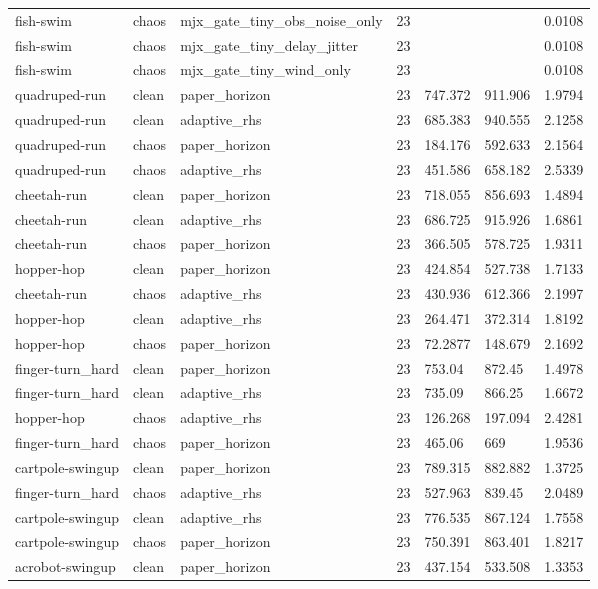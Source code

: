 \begin{tabular}{lllllll}
fish-swim & chaos & mjx\_gate\_tiny\_obs\_noise\_only & 23 &  &  & 0.0108 \\
fish-swim & chaos & mjx\_gate\_tiny\_delay\_jitter & 23 &  &  & 0.0108 \\
fish-swim & chaos & mjx\_gate\_tiny\_wind\_only & 23 &  &  & 0.0108 \\
quadruped-run & clean & paper\_horizon & 23 & 747.372 & 911.906 & 1.9794 \\
quadruped-run & clean & adaptive\_rhs & 23 & 685.383 & 940.555 & 2.1258 \\
quadruped-run & chaos & paper\_horizon & 23 & 184.176 & 592.633 & 2.1564 \\
quadruped-run & chaos & adaptive\_rhs & 23 & 451.586 & 658.182 & 2.5339 \\
cheetah-run & clean & paper\_horizon & 23 & 718.055 & 856.693 & 1.4894 \\
cheetah-run & clean & adaptive\_rhs & 23 & 686.725 & 915.926 & 1.6861 \\
cheetah-run & chaos & paper\_horizon & 23 & 366.505 & 578.725 & 1.9311 \\
hopper-hop & clean & paper\_horizon & 23 & 424.854 & 527.738 & 1.7133 \\
cheetah-run & chaos & adaptive\_rhs & 23 & 430.936 & 612.366 & 2.1997 \\
hopper-hop & clean & adaptive\_rhs & 23 & 264.471 & 372.314 & 1.8192 \\
hopper-hop & chaos & paper\_horizon & 23 & 72.2877 & 148.679 & 2.1692 \\
finger-turn\_hard & clean & paper\_horizon & 23 & 753.04 & 872.45 & 1.4978 \\
finger-turn\_hard & clean & adaptive\_rhs & 23 & 735.09 & 866.25 & 1.6672 \\
hopper-hop & chaos & adaptive\_rhs & 23 & 126.268 & 197.094 & 2.4281 \\
finger-turn\_hard & chaos & paper\_horizon & 23 & 465.06 & 669 & 1.9536 \\
cartpole-swingup & clean & paper\_horizon & 23 & 789.315 & 882.882 & 1.3725 \\
finger-turn\_hard & chaos & adaptive\_rhs & 23 & 527.963 & 839.45 & 2.0489 \\
cartpole-swingup & clean & adaptive\_rhs & 23 & 776.535 & 867.124 & 1.7558 \\
cartpole-swingup & chaos & paper\_horizon & 23 & 750.391 & 863.401 & 1.8217 \\
acrobot-swingup & clean & paper\_horizon & 23 & 437.154 & 533.508 & 1.3353 \\

\end{tabular}
